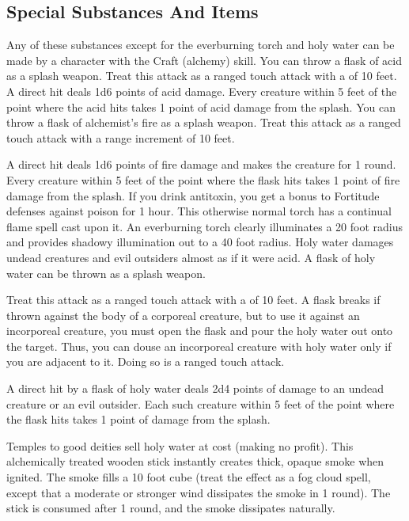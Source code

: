 \subsection{Special Substances And Items}
Any of these substances except for the everburning torch and holy water can be made by a character with the Craft (alchemy) skill.
 You can throw a flask of acid as a splash weapon. Treat this attack as a ranged touch attack with a  of 10 feet. A direct hit deals 1d6 points of acid damage. Every creature within 5 feet of the point where the acid hits takes 1 point of acid damage from the splash.
 You can throw a flask of alchemist's fire as a splash weapon. Treat this attack as a ranged touch attack with a range increment of 10 feet.
\par A direct hit deals 1d6 points of fire damage and makes the creature \ignited for 1 round. Every creature within 5 feet of the point where the flask hits takes 1 point of fire damage from the splash.
 If you drink antitoxin, you get a  bonus to Fortitude defenses against poison for 1 hour.
 This otherwise normal torch has a continual flame spell cast upon it. An everburning torch clearly illuminates a 20 foot radius and provides shadowy illumination out to a 40 foot radius.
 Holy water damages undead creatures and evil outsiders almost as if it were acid. A flask of holy water can be thrown as a splash weapon.
\par Treat this attack as a ranged touch attack with a  of 10 feet. A flask breaks if thrown against the body of a corporeal creature, but to use it against an incorporeal creature, you must open the flask and pour the holy water out onto the target. Thus, you can douse an incorporeal creature with holy water only if you are adjacent to it. Doing so is a ranged touch attack.
\par A direct hit by a flask of holy water deals 2d4 points of damage to an undead creature or an evil outsider. Each such creature within 5 feet of the point where the flask hits takes 1 point of damage from the splash.
\par Temples to good deities sell holy water at cost (making no profit).
 This alchemically treated wooden stick instantly creates thick, opaque smoke when ignited. The smoke fills a 10 foot cube (treat the effect as a fog cloud spell, except that a moderate or stronger wind dissipates the smoke in 1 round). The stick is consumed after 1 round, and the smoke dissipates naturally.
